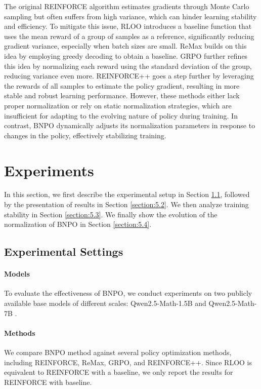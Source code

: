\documentclass{article}
\theoremstyle{plain}
\theoremstyle{definition}
\theoremstyle{remark}
\begin{document}
The original REINFORCE algorithm \citep{williams1992simple} estimates gradients through Monte Carlo sampling but often suffers from high variance, which can hinder learning stability and efficiency. To mitigate this issue, RLOO \citep{kool2019buy} introduces a baseline function that uses the mean reward of a group of samples as a reference, significantly reducing gradient variance, especially when batch sizes are small. ReMax \citep{li2024remax} builds on this idea by employing greedy decoding to obtain a baseline. GRPO \citep{shao2024deepseekmath} further refines this idea by normalizing each reward using the standard deviation of the group, reducing variance even more. REINFORCE++ \citep{hu2025reinforce++} goes a step further by leveraging the rewards of all samples to estimate the policy gradient, resulting in more stable and robust learning performance. However, these methods either lack proper normalization or rely on static normalization strategies, which are insufficient for adapting to the evolving nature of policy during training. In contrast, BNPO dynamically adjusts its normalization parameters in response to changes in the policy, effectively stabilizing training.


\section{Experiments}
In this section, we first describe the experimental setup in Section \ref{section:5.1}, followed by the presentation of results in Section \ref{section:5.2}. We then analyze training stability in Section \ref{section:5.3}. We finally show the evolution of the normalization of BNPO in Section \ref{section:5.4}.
\subsection{Experimental Settings}
\label{section:5.1}
\paragraph{Models}
To evaluate the effectiveness of BNPO, we conduct experiments on two publicly available base models of different scales: Qwen2.5-Math-1.5B and Qwen2.5-Math-7B \citep{yang2024qwen2, yang2024qwen2_math}.

\paragraph{Methods}
We compare BNPO method against several policy optimization methods, including REINFORCE, ReMax, GRPO, and REINFORCE++. Since RLOO is equivalent to REINFORCE with a baseline, we only report the results for REINFORCE with baseline.
\end{document}
